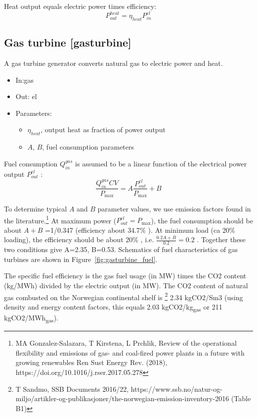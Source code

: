 \documentclass[12pt]{article}
\begin{document}
Heat output equals electric power times efficiency:
\begin{equation}
	P_{out}^{heat}= \eta _{heat}P_{in}^{el}
\end{equation}



\subsection{Gas turbine [gasturbine]}
A gas turbine generator converts natural gas to electric power and heat.

\begin{itemize}
\item In:gas
\item Out: el
\item Parameters:
\begin{itemize}[noitemsep,topsep=0pt]
	\item $\eta_{heat}$,  output heat as fraction of power output
	\item 	$A$, $B$, fuel consumption parameters
\end{itemize}
\end{itemize}


\medskip\noindent

Fuel consumption  \( Q_{in}^{gas} \)  is assumed to be a linear function of the electrical power output  \( P_{out}^{el} \) :
\begin{equation}
	 \frac{Q_{in}^{gas} CV}{P_{\max }}=A\frac{P_{out}^{el}}{P_{\max }}+B 
\end{equation}


To determine typical $A$ and $B$ parameter values, we use
emission factors found in the literature.\footnote{ MA Gonzalez-Salazara, T Kirstena, L Prchlik, Review of the operational flexibility and emissions of gas- and coal-fired power plants in a future with growing renewables Ren Sust Energy Rev. (2018), https://doi.org/10.1016/j.rser.2017.05.278  }
%
At maximum power (\( P_{out}^{el}=P_{\max } \)), the fuel consumption should be about  \( A+B \) =1/0.347 (efficiency about 34.7$\%$ ). At minimum load (ca 20$\%$  loading), the efficiency should be about 20$\%$ , i.e.  \( \frac{0.2A+B}{0.2}=0.2 \) . Together these two conditions give A=2.35, B=0.53. Schematics of fuel characteristics of gas turbines are shown in Figure~\ref{fig:gasturbine_fuel}.

The specific fuel efficiency is the gas fuel usage (in MW) times the CO2 content (kg/MWh) divided by the electric output (in MW). The CO2 content of natural gas combusted on the Norwegian continental shelf is%
\footnote{T Sandmo, SSB Documents 2016/22, https://www.ssb.no/natur-og-miljo/artikler-og-publikasjoner/the-norwegian-emission-inventory-2016 (Table B1) } 
2.34 kgCO2/Sm3 (using density and energy content factors, this equals 2.03 kgCO2/kg\textsubscript{gas} 
or 211 kgCO2/MWh\textsubscript{gas}). 
\end{document}
